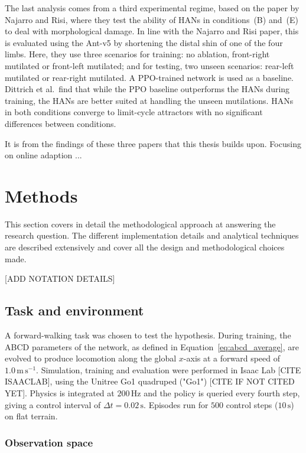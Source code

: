 \documentclass{article} %
\begin{document}
The last analysis comes from a third experimental regime, based on the paper by Najarro and Risi, where they test the ability of HANs in conditions~(B) and~(E) to deal with morphological damage. In line with the Najarro and Risi paper, this is evaluated using the Ant-v5 by shortening the distal shin of one of the four limbs. Here, they use three scenarios for training: no ablation, front-right mutilated or front-left mutilated; and for testing, two unseen scenarios: rear-left mutilated or rear-right mutilated. A PPO-trained network is used as a baseline. Dittrich et al.\ find that while the PPO baseline outperforms the HANs during training, the HANs are better suited at handling the unseen mutilations. HANs in both conditions converge to limit-cycle attractors with no significant differences between conditions.

It is from the findings of these three papers that this thesis builds upon. Focusing on online adaption ... 

\section{Methods}
\label{sec:methods}

This section covers in detail the methodological approach at answering the research question. The different implementation details and analytical techniques are described extensively and cover all the design and methodological choices made.  

[ADD NOTATION DETAILS]

\subsection{Task and environment}
\label{subsec:task_and_environment}

A forward-walking task was chosen to test the hypothesis. During training, the
ABCD parameters of the network, as defined in Equation~\ref{eq:abcd_average}, are evolved to produce locomotion along the
global $x$-axis at a forward speed of $1.0\,\mathrm{m\,s^{-1}}$. Simulation,
training and evaluation were performed in Isaac Lab [CITE ISAACLAB], using the
Unitree Go1 quadruped ("Go1") [CITE IF NOT CITED YET]. Physics is integrated at $200\,\mathrm{Hz}$
and the policy is queried every fourth step, giving a control interval of
$\Delta t = 0.02\,\mathrm{s}$. Episodes run for $500$ control steps
($10\,\mathrm{s}$) on flat terrain.

\subsubsection{Observation space}
\end{document}
